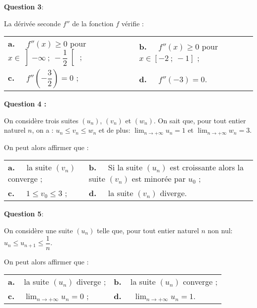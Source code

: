 \documentclass[10pt,a4paper]{article}
\begin{document}
\medskip

\textbf{Question 3}:

La dérivée seconde $f''$ de la fonction $f$ vérifie :

\begin{center}
\begin{tabularx}{\linewidth}{X X}
\textbf{a.~~} $f''(x) \geqslant  0$ pour $x \in \left]-\infty~;~- \dfrac12\right[$ ; &\textbf{b.~~} $f''(x) \geqslant  0$ pour $x \in [- 2~;~- 1]$ ;\\
\textbf{c.~~} $f''\left(- \dfrac32 \right) = 0$ ;&\textbf{d.~~} $f''(- 3) = 0$.
\end{tabularx}
\end{center}


\textbf{Question 4 :}

\medskip

On considère trois suites $\left(u_n\right)$, $\left(v_n\right)$ et $\left(w_n\right)$. On sait que, pour tout entier naturel $n$, on a : $u_n \leqslant v_n\leqslant  w_n$ et de plus: $\displaystyle\lim_{n \to + \infty} u_n= 1$ et $\displaystyle\lim_{n \to + \infty} w_n= 3$.

On peut alors affirmer que :

\begin{center}
\begin{tabularx}{\linewidth}{X X}
\textbf{a.~~} la suite $\left(v_n\right)$ converge ;&\textbf{b.~~} Si la suite 
$\left(u_n\right)$ est croissante alors la suite $\left(v_n\right)$ est minorée par $u_0$ ;\\
\textbf{c.~~} $1 \leqslant  v_0 \leqslant 3$ ;&\textbf{d.~~} la suite $\left(v_n\right)$ diverge.
\end{tabularx}
\end{center}

\medskip

\textbf{Question 5}:

\medskip

On considère une suite $\left(u_n\right)$ telle que, pour tout entier naturel $n$ non nul: $u_n \leqslant  u_{n+1}  \leqslant \dfrac1n$.

On peut alors affirmer que : 

\begin{center}
\begin{tabularx}{\linewidth}{X X}
\textbf{a.~~}la suite $\left(u_n\right)$ diverge ;&\textbf{b.~~}la suite $\left(u_n\right)$ converge ;\\
\textbf{c.~~}$\displaystyle\lim_{n \to + \infty} u_n =  0$ ;&\textbf{d.~~} $\displaystyle\lim_{n \to + \infty} u_n =  1$.
\end{tabularx}
\end{center}
\end{document}
